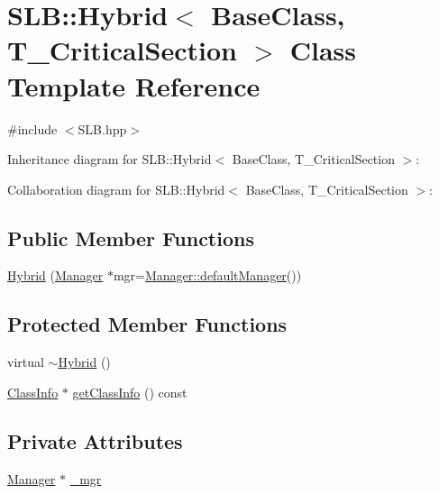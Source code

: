 \hypertarget{classSLB_1_1Hybrid}{}\section{S\+LB\+:\+:Hybrid$<$ Base\+Class, T\+\_\+\+Critical\+Section $>$ Class Template Reference}
\label{classSLB_1_1Hybrid}


{\ttfamily \#include $<$S\+L\+B.\+hpp$>$}



Inheritance diagram for S\+LB\+:\+:Hybrid$<$ Base\+Class, T\+\_\+\+Critical\+Section $>$\+:


Collaboration diagram for S\+LB\+:\+:Hybrid$<$ Base\+Class, T\+\_\+\+Critical\+Section $>$\+:
\subsection*{Public Member Functions}
\begin{DoxyCompactItemize}
\item 
\hyperlink{classSLB_1_1Hybrid_a20f2495d82fc3dc68f17b5ae9d08e1c7}{Hybrid} (\hyperlink{classSLB_1_1Manager}{Manager} $\ast$mgr=\hyperlink{classSLB_1_1Manager_a174e4612520c3412d10a68e659651677}{Manager\+::default\+Manager}())
\end{DoxyCompactItemize}
\subsection*{Protected Member Functions}
\begin{DoxyCompactItemize}
\item 
virtual \hyperlink{classSLB_1_1Hybrid_a1ce0159a0af61dc466b41a8543ec562d}{$\sim$\+Hybrid} ()
\item 
\hyperlink{classSLB_1_1ClassInfo}{Class\+Info} $\ast$ \hyperlink{classSLB_1_1Hybrid_a8b1b05a6fe71cd8545bcf1172e343ee4}{get\+Class\+Info} () const 
\end{DoxyCompactItemize}
\subsection*{Private Attributes}
\begin{DoxyCompactItemize}
\item 
\hyperlink{classSLB_1_1Manager}{Manager} $\ast$ \hyperlink{classSLB_1_1Hybrid_aefbf73e7bb15249e537d96673fed23f7}{\+\_\+mgr}
\end{DoxyCompactItemize}
